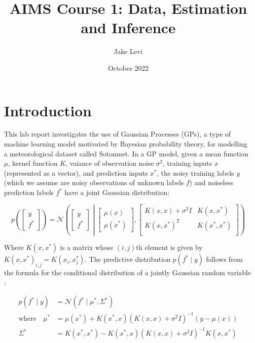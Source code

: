 \documentclass{article}
\title{AIMS Course 1: Data, Estimation and Inference}
\author{Jake Levi}
\date{October 2022}
\begin{document}
\maketitle


\section{Introduction}

This lab report investigates the use of Gaussian Processes (GPs), a type of machine learning model motivated by Bayesian probability theory, for modelling a meteorological dataset called Sotonmet. In a GP model, given a mean function $\mu$, kernel function $K$, vaiance of observation noise $\sigma^2$, training inputs $x$ (represented as a vector), and prediction inputs $x^*$, the noisy training labels $y$ (which we assume are noisy observations of unknown labels $f$) and noiseless prediction labels $f^*$ have a joint Gaussian distribution:


\begin{equation}
    p\left( \begin{bmatrix}
        y \\
        f^*
    \end{bmatrix} \right)
    = \mathcal{N} \left( \begin{bmatrix}
        y \\
        f^*
    \end{bmatrix} \middle| \begin{bmatrix}
        \mu(x) \\
        \mu(x^*)
    \end{bmatrix}, \begin{bmatrix}
        K(x, x) + \sigma^2 I & K(x, x^*) \\
        K(x, x^*)^T & K(x^*, x^*) \\
    \end{bmatrix} \right)
\end{equation}

Where $K(x, x^*)$ is a matrix whose $(i, j)$th element is given by $K(x, x^*)_{i,j} = K(x_i, x^*_j)$. The predictive distribution $p(f^* \mid y)$ follows from the formula for the conditional distribution of a jointly Gaussian random variable \cite{bishop2006pattern}:


\begin{align}
    p(f^* \mid y) &= \mathcal{N}\left(f^* \mid \mu^*, \Sigma^* \right) \\
    \text{where} \quad \mu^* &= \mu(x^*) + K(x^*, x) \left( K(x, x) + \sigma^2 I \right)^{-1} (y - \mu(x)) \\
    \Sigma^* &= K(x^*, x^*) - K(x^*, x) \left( K(x, x) + \sigma^2 I \right) ^{-1} K(x, x^*)
\end{align}
\end{document}
